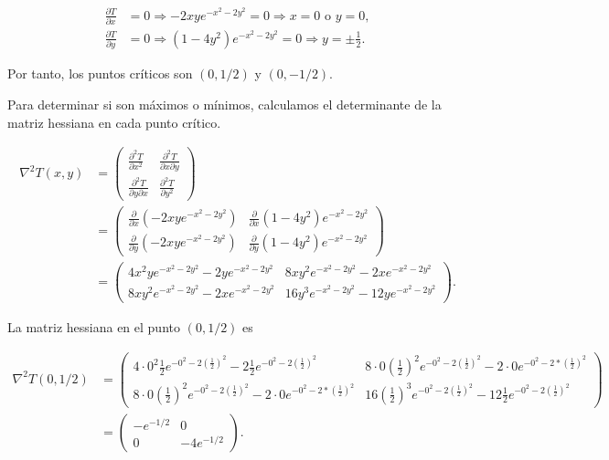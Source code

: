 \documentclass[
  a4paper,
]{scrreport}
\theoremstyle{definition}
\theoremstyle{remark}
\begin{document}
\begin{tcolorbox}
\begin{enumerate}
  \begin{align*}
  \frac{\partial T}{\partial x} &= 0 \Rightarrow -2xye^{-x^2-2y^2} = 0 \Rightarrow x = 0 \mbox{ o } y = 0, \\
  \frac{\partial T}{\partial y} &= 0 \Rightarrow (1-4y^2)e^{-x^2-2y^2} = 0 \Rightarrow y = \pm \frac{1}{2}.
  \end{align*}

  Por tanto, los puntos críticos son \((0,1/2)\) y \((0,-1/2)\).

  Para determinar si son máximos o mínimos, calculamos el determinante
  de la matriz hessiana en cada punto crítico.

  \begin{align*}
  \nabla^2T(x,y) &= \begin{pmatrix}
  \frac{\partial^2 T}{\partial x^2} & \frac{\partial^2 T}{\partial x\partial y} \\
  \frac{\partial^2 T}{\partial y\partial x} & \frac{\partial^2 T}{\partial y^2}
  \end{pmatrix} \\
  &= \begin{pmatrix}
  \frac{\partial}{\partial x}(-2xye^{-x^2-2y^2}) & \frac{\partial}{\partial x}(1-4y^2)e^{-x^2-2y^2} \\
  \frac{\partial}{\partial y}(-2xye^{-x^2-2y^2}) & \frac{\partial}{\partial y}(1-4y^2)e^{-x^2-2y^2}
  \end{pmatrix} \\
  &= \begin{pmatrix}
  4x^2ye^{-x^2 - 2y^2} - 2ye^{-x^2 - 2y^2} & 8xy^2e^{-x^2 - 2y^2} - 2xe^{-x^2 - 2y^2} \\
  8xy^2e^{-x^2 - 2y^2} - 2xe^{-x^2 - 2y^2} & 16y^3e^{-x^2 - 2y^2} - 12ye^{-x^2 - 2y^2}
  \end{pmatrix}.
  \end{align*}

  La matriz hessiana en el punto \((0,1/2)\) es

  \begin{align*}
  \nabla^2T(0,1/2) 
  &= \begin{pmatrix}
  4\cdot 0^2\frac{1}{2}e^{-0^2 - 2\left(\frac{1}{2}\right)^2} - 2\frac{1}{2}e^{-0^2 - 2\left(\frac{1}{2}\right)^2} & 8\cdot 0\left(\frac{1}{2}\right)^2e^{-0^2 - 2\left(\frac{1}{2}\right)^2} - 2\cdot 0e^{-0^2 - 2*\left(\frac{1}{2}\right)^2} \\
  8\cdot 0\left(\frac{1}{2}\right)^2e^{-0^2 - 2\left(\frac{1}{2}\right)^2} - 2\cdot 0e^{-0^2 - 2*\left(\frac{1}{2}\right)^2} & 16\left(\frac{1}{2}\right)^3e^{-0^2 - 2\left(\frac{1}{2}\right)^2} - 12\frac{1}{2}e^{-0^2 - 2\left(\frac{1}{2}\right)^2} 
  \end{pmatrix}\\
  &= \begin{pmatrix}
  -e^{-1/2} & 0 \\
  0 & -4e^{-1/2}
  \end{pmatrix}.
  \end{align*}


\end{enumerate}
\end{tcolorbox}
\end{document}
